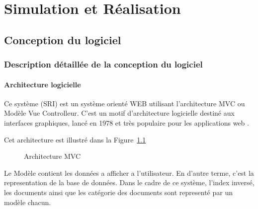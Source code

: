 \chapter{Simulation et Réalisation}
\section{Conception du logiciel}
\subsection{Description détaillée de la conception du logiciel}
\subsubsection{Architecture logicielle}
Ce système (SRI) est un système orienté WEB utilisant l'architecture MVC ou Modèle Vue Controlleur. C'est un motif d'architecture logicielle destiné aux interfaces graphiques, lancé en 1978 et très populaire pour les applications web \citep{mvcwiki}.

Cet architecture est illustré dans la Figure~\ref{fig:mvc}

\begin{figure}[htbp]
    \begin{center}
    \end{center}
    \caption{Architecture MVC \citep{mvcwiki}}\label{fig:mvc}
\end{figure}

Le Modèle contient les données a afficher a l'utilisateur. En d'autre terme, c'est la representation de la base de données. Dans le cadre de ce système, l'index inversé, les documents ainsi que les catégorie des documents sont representé par un modèle chacun.

